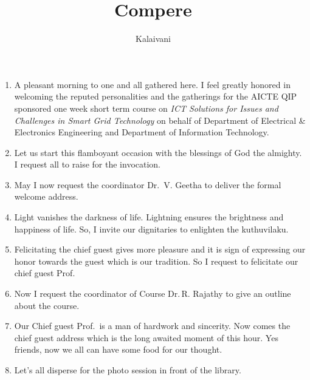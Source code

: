 \documentclass[12pt]{article}
\title{Compere}
\author{Kalaivani}
\begin{document}
  \maketitle
  \doublespacing
  \begin{enumerate}
    \item A pleasant morning to one and all gathered here.  I feel greatly honored in welcoming the reputed personalities and the gatherings for the AICTE QIP sponsored one week short term course on \emph{ICT Solutions for Issues and Challenges in Smart Grid Technology} on behalf of Department of Electrical \& Electronics Engineering and Department of Information Technology.
    \item Let us start this flamboyant occasion with the blessings of God the almighty. I request all to raise for the invocation.
    \item May I now request the coordinator Dr.\, V. Geetha to deliver the formal welcome address.
    \item Light vanishes the darkness of life. Lightning ensures the brightness and happiness of life. So, I invite our dignitaries to enlighten the kuthuvilaku.
    \item Felicitating the chief guest gives more pleasure and it is sign of expressing our honor towards the guest which is our tradition. So I request \underline{\hspace{1.5in}} to felicitate our chief guest Prof.\,\underline{\hspace{1.5in}}
    \item Now I request the coordinator of Course Dr.\,R. Rajathy to give an outline about the course.
    \item Our Chief guest Prof.\,\underline{\hspace{1.5in}} is a man of hardwork and sincerity. Now comes the chief guest address which is the long awaited moment of this hour. Yes friends, now we all can have some food for our thought.
    \item Let's all disperse for the photo session in front of the library.
  \end{enumerate}
\end{document}

